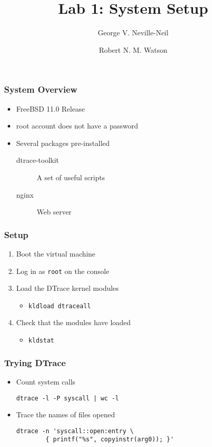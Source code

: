 \documentclass[pdftex,handout]{beamer}
\begin{document}

\title{Lab 1: System Setup}
\author[shortname]{George V. Neville-Neil \and Robert N. M. Watson}

\begin{frame}
  \titlepage
\end{frame}

\begin{frame}
  \frametitle{System Overview}
  \begin{itemize}
  \item FreeBSD 11.0 Release
  \item root account does not have a password
  \item Several packages pre-installed
    \begin{description}
    \item [dtrace-toolkit] A set of useful scripts
    \item[nginx] Web server
    \end{description}
  \end{itemize}
\end{frame}

\begin{frame}[fragile]
  \frametitle{Setup}
  \begin{enumerate}
  \item Boot the virtual machine
  \item Log in as \verb|root| on the console
  \item Load the DTrace kernel modules
    \begin{itemize}
    \item \verb|kldload dtraceall|
    \end{itemize}
  \item Check that the modules have loaded
    \begin{itemize}
    \item \verb|kldstat|
    \end{itemize}
  \end{enumerate}
\end{frame}

\begin{frame}[fragile]
  \frametitle{Trying DTrace}
  \begin{itemize}
  \item Count system calls
\begin{lstlisting}[basicstyle=\small,numbers=none]
dtrace -l -P syscall | wc -l
\end{lstlisting}
  \item Trace the names of files opened
\begin{lstlisting}[basicstyle=\small,numbers=none]
dtrace -n 'syscall::open:entry \
        { printf("%s", copyinstr(arg0)); }'
\end{lstlisting}
  \end{itemize}
\end{frame}
\end{document}
